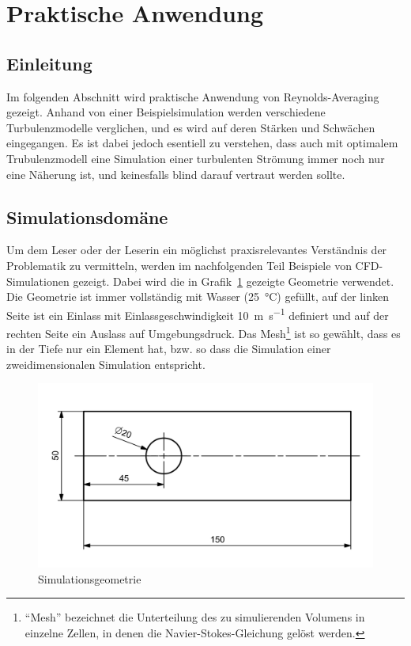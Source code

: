 %
%
\section{Praktische Anwendung}

\subsection{Einleitung}

Im folgenden Abschnitt wird praktische Anwendung von Reynolds-Averaging gezeigt.
%
Anhand von einer Beispielsimulation werden verschiedene Turbulenzmodelle verglichen, und es wird auf deren Stärken und Schwächen eingegangen.
Es ist dabei jedoch esentiell zu verstehen, dass auch mit optimalem Trubulenzmodell eine Simulation einer turbulenten Strömung immer noch nur eine Näherung ist,
und keinesfalls blind darauf vertraut werden sollte.

\subsection{Simulationsdomäne}
\label{subsubsec:domain-desc}

Um dem Leser oder der Leserin ein möglichst praxisrelevantes Verständnis der Problematik zu vermitteln, werden
im nachfolgenden Teil Beispiele von CFD-Simulationen gezeigt.
Dabei wird die in Grafik~\ref{fig:SimDomain} gezeigte Geometrie verwendet.
Die Geometrie ist immer vollständig mit Wasser (\SI{25}{\degreeCelsius}) gefüllt,
auf der linken Seite ist ein Einlass mit Einlassgeschwindigkeit \SI{10}{\meter\per\second} definiert und
auf der rechten Seite ein Auslass auf Umgebungsdruck.
Das Mesh\footnote{``Mesh'' bezeichnet die Unterteilung des zu simulierenden Volumens in einzelne Zellen,
in denen die Navier-Stokes-Gleichung gelöst werden.} ist so gewählt, dass es in der Tiefe nur ein Element hat,
bzw. so dass die Simulation einer zweidimensionalen Simulation entspricht.

\begin{figure}
    \includegraphics[width=\textwidth]{papers/reynolds/images/domain.png}
    \caption{Simulationsgeometrie}
    \label{fig:SimDomain}
\end{figure}

